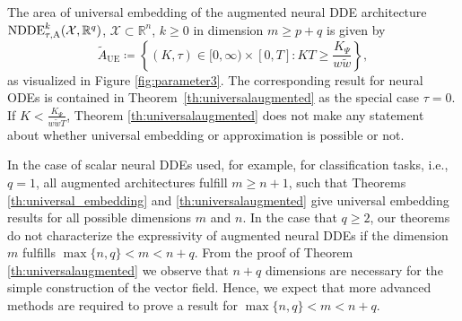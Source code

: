 \documentclass[10pt]{article}
\numberwithin{equation}{section}
\begin{document}
	The area of universal embedding of the augmented neural DDE architecture $\textup{NDDE}_{\tau,\textup{A}}^k(\mathcal{X},\mathbb{R}^q)$, $\mathcal{X}\subset \mathbb{R}^n$, $k \geq 0$ in dimension $m \geq p+q$ is given by
	\begin{equation*}
		\widetilde{A}_\text{UE} \coloneqq \left\{(K,\tau) \in [0,\infty) \times [0,T]: KT \geq \frac{K_\Psi}{w \tilde w}\right\},
	\end{equation*}
	as visualized in Figure \ref{fig:parameter3}. The corresponding result for neural ODEs is contained in Theorem~\ref{th:universalaugmented} as the special case $\tau = 0$. If $K<\frac{K_\Psi}{w \tilde w T}$, Theorem \ref{th:universalaugmented} does not make any statement about whether universal embedding or approximation is possible or not. 
	
	In the case of scalar neural DDEs used, for example, for classification tasks, i.e., $q = 1$, all augmented architectures fulfill $m \geq n+1$, such that Theorems \ref{th:universal_embedding} and \ref{th:universalaugmented} give universal embedding results for all possible dimensions $m$ and $n$. In the case that $q \geq 2$, our theorems do not characterize the expressivity of augmented neural DDEs if the dimension $m$ fulfills $\max\{n,q\}<m<n+q$. From the proof of Theorem \ref{th:universalaugmented} we observe that $n+q$ dimensions are necessary for the simple construction of the vector field. Hence, we expect that more advanced methods are required to prove a result for $\max\{n,q\}<m<n+q$. 
	
\end{document}
